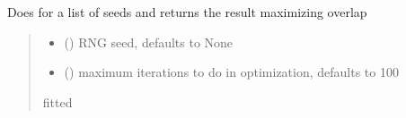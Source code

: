 \documentclass[letterpaper,10pt,english]{sphinxmanual}
\begin{document}
\begin{fulllineitems}
\begin{fulllineitems}
\label{\detokenize{spinbox:spinbox.core.HilbertState.nearest_product_state}}
\pysigstartsignatures
{}
\pysigstopsignatures
\sphinxAtStartPar
Does  for a list of seeds and returns the result maximizing overlap
\begin{quote}\begin{description}
\begin{itemize}
\item {} 
\sphinxAtStartPar
{} (\sphinxstyleliteralemphasis{\sphinxupquote{, }}) \textendash{} RNG seed, defaults to None

\item {} 
\sphinxAtStartPar
{} (\sphinxstyleliteralemphasis{\sphinxupquote{, }}) \textendash{} maximum iterations to do in optimization, defaults to 100

\end{itemize}

\sphinxAtStartPar
fitted 

\sphinxAtStartPar
{\hyperref[\detokenize{spinbox:spinbox.core.ProductState}]{}}

\end{description}\end{quote}

\end{fulllineitems}



\end{fulllineitems}
\end{document}

